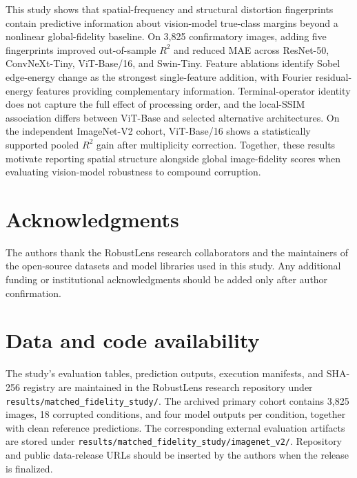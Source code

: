 \documentclass[10pt,twocolumn]{article}
\begin{document}
This study shows that spatial-frequency and structural distortion fingerprints contain predictive information about vision-model true-class margins beyond a nonlinear global-fidelity baseline. On 3,825 confirmatory images, adding five fingerprints improved out-of-sample $R^2$ and reduced MAE across ResNet-50, ConvNeXt-Tiny, ViT-Base/16, and Swin-Tiny. Feature ablations identify Sobel edge-energy change as the strongest single-feature addition, with Fourier residual-energy features providing complementary information. Terminal-operator identity does not capture the full effect of processing order, and the local-SSIM association differs between ViT-Base and selected alternative architectures. On the independent ImageNet-V2 cohort, ViT-Base/16 shows a statistically supported pooled $R^2$ gain after multiplicity correction. Together, these results motivate reporting spatial structure alongside global image-fidelity scores when evaluating vision-model robustness to compound corruption.

\section*{Acknowledgments}
The authors thank the RobustLens research collaborators and the maintainers of the open-source datasets and model libraries used in this study. Any additional funding or institutional acknowledgments should be added only after author confirmation.

\section*{Data and code availability}
The study's evaluation tables, prediction outputs, execution manifests, and SHA-256 registry are maintained in the RobustLens research repository under \texttt{results/matched\_fidelity\_study/}. The archived primary cohort contains 3,825 images, 18 corrupted conditions, and four model outputs per condition, together with clean reference predictions. The corresponding external evaluation artifacts are stored under \texttt{results/matched\_fidelity\_study/imagenet\_v2/}. Repository and public data-release URLs should be inserted by the authors when the release is finalized.
\end{document}
